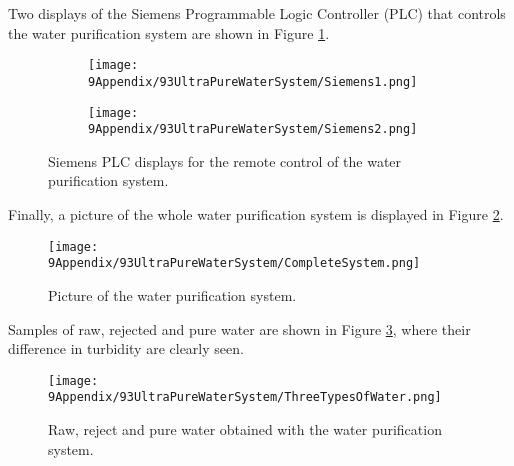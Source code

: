 Two displays of the Siemens Programmable Logic Controller (PLC) that controls the water purification system are shown in Figure \ref{fig:Siemens}.
\begin{figure}
\centering
    \begin{subfigure}[b]{0.75\textwidth}
    \centering
    \texttt{[image: 9Appendix/93UltraPureWaterSystem/Siemens1.png]}  
    \caption{}
    \end{subfigure}
    \hfill
    \begin{subfigure}[b]{0.75\textwidth}
    \centering
    \texttt{[image: 9Appendix/93UltraPureWaterSystem/Siemens2.png]}  
    \caption{}
    \end{subfigure}
 \caption{Siemens PLC displays for the remote control of the water purification system.}
 \label{fig:Siemens}
\end{figure}
Finally, a picture of the whole water purification system is displayed in Figure \ref{fig:CompleteSystem}.
\begin{figure}[htbp]
\centering
\texttt{[image: 9Appendix/93UltraPureWaterSystem/CompleteSystem.png]}
\caption{Picture of the water purification system.\label{fig:CompleteSystem}}
\end{figure}
Samples of raw, rejected and pure water are shown in Figure \ref{fig:ThreeTypesOfWater}, where their difference in turbidity are clearly seen.
\begin{figure}[htbp]
\centering
\texttt{[image: 9Appendix/93UltraPureWaterSystem/ThreeTypesOfWater.png]}
\caption{Raw, reject and pure water obtained with the water purification system.\label{fig:ThreeTypesOfWater}}
\end{figure}
